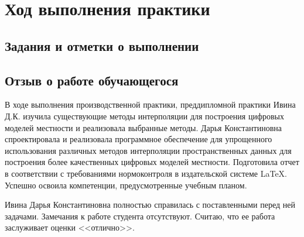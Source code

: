\chapter*{Ход выполнения практики}

\section*{Задания и отметки о выполнении}








\clearpage
\section*{Отзыв о работе обучающегося}

В ходе выполнения производственной практики, преддипломной практики Ивина Д.К. изучила существующие методы интерполяции для построения цифровых моделей местности и реализовала выбранные методы. Дарья Константиновна спроектировала и реализовала программное обеспечение для упрощенного использования различных методов интерполяции пространственных данных для построения более качественных цифровых моделей местности. Подготовила отчет в соответствии с требованиями нормоконтроля в издательской системе \LaTeX. Успешно освоила компетенции, предусмотренные учебным планом. 

Ивина Дарья Константиновна полностью справилась с поставленными перед ней задачами. Замечания к работе студента отсутствуют. Считаю, что ее работа заслуживает оценки <<отлично>>.

\progressapprov
